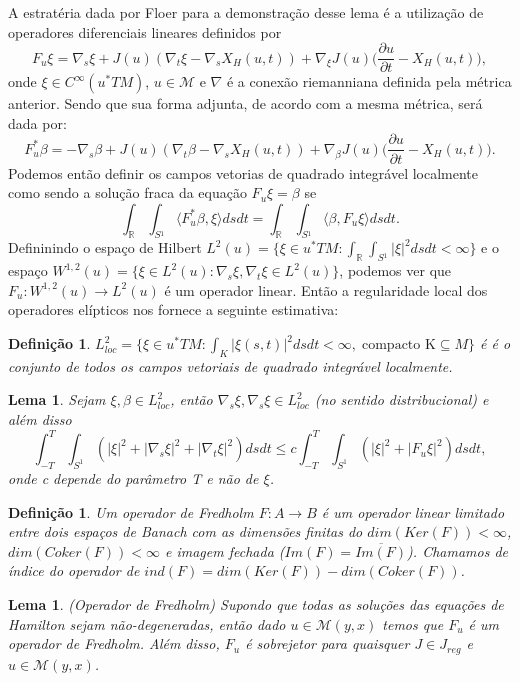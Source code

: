 \documentclass[12pt]{book}
\newtheorem{lema}[teorema]{Lema}
\newtheorem{definicao}[teorema]{Definição}
\newcommand{\derivadaparcial}[2]{\frac{\partial #1}{\partial #2}}
\newcommand{\iprod}[2]{\langle #1, #2 \rangle}
\newcommand{\real}[1]{\mathbb{R}^{#1}}
\newcommand{\vermelho}[1]{{\color{red}#1}}
\begin{document}
	A estratéria dada por Floer para a demonstração desse lema 
	é a utilização de operadores diferenciais lineares  definidos por 
	$$
	F_{u} \xi = \nabla_{s}\xi+J(u)(\nabla_{t}\xi - \nabla_{s}X_{H}(u,t))+\nabla_{\xi}J(u)\Big(\derivadaparcial{u}{t}-X_{H}(u,t)\Big),
	$$
	onde $\xi \in C^{\infty}(u^{*}TM)$, $u \in \mathcal{M}$ e $\nabla$ é a conexão riemanniana definida pela métrica anterior. Sendo que sua forma adjunta, de acordo com a mesma métrica, será dada por:
	$$
	F_{u}^{*} \beta = -\nabla_{s}\beta+J(u)(\nabla_{t}\beta - \nabla_{s}X_{H}(u,t))+\nabla_{\beta}J(u)\Big(\derivadaparcial{u}{t}-X_{H}(u,t)\Big).
	$$
	Podemos então definir 	os campos vetorias de quadrado integrável localmente como sendo a solução fraca da equação $F_{u}\xi = \beta$ se 
	$$
	\int_{\real{}} \int_{S{^{1}}} \iprod{F_{u}^{*}\beta}{\xi} dsdt= 
	\int_{\real{}} \int_{S{^{1}}} \iprod{\beta}{F_{u}\xi} dsdt.
	$$
	Defininindo o espaço de Hilbert $L^{2}(u) = \{\xi \in u^{*}TM: \int_{\real{}} \int_{S{^{1}}}|\xi|^{2} dsdt < \infty\}$ e o espaço $W^{1,2}(u) = \{\xi \in L^{2}(u):\nabla_{s} \xi,\nabla_{t} \xi \in L^{2}(u) \}$, podemos ver que $F_{u}: W^{1,2}(u) \to L^{2}(u)$ é um operador linear. \vermelho{Então a regularidade local dos operadores elípticos nos fornece a seguinte estimativa:}
	
	\begin{definicao}
		$L^{2}_{loc} = \{\xi \in u^{*}TM: \int_{K} |\xi(s,t)|^{2}dsdt <\infty, \; \text{compacto K} \subseteq M \}$ é é o conjunto de todos os campos vetoriais de quadrado integrável localmente.
	\end{definicao}
	
	\begin{lema}
		Sejam $\xi, \beta \in L^{2}_{loc}$, então $\nabla_{s}\xi, \nabla_{s}\xi \in L^{2}_{loc}$ (no sentido distribucional) e além disso
		$$
		\int_{-T}^{T}\int_{S^{1}}(|\xi|^{2}+|\nabla_{s}\xi|^{2}+|\nabla_{t}\xi|^{2})dsdt \leq c \int_{-T}^{T}\int_{S^{1}}(|\xi|^{2}+|F_{u}\xi|^{2})dsdt,
		$$
		onde c depende do parâmetro T e não de $\xi$.
	\end{lema}
	
	\begin{definicao}
		Um operador de Fredholm $F: A\to B$ é um operador linear limitado entre dois espaços de Banach com as dimensões finitas do $dim(Ker(F))< \infty$, $dim(Coker(F))< \infty$ e imagem fechada ($Im(F)=\overline{Im(F)}$). Chamamos de índice do operador de $ind (F)  = dim(Ker(F)) - dim(Coker(F))$.
	\end{definicao}
	
	\begin{lema}
		(Operador de Fredholm) Supondo que todas as soluções das equações de Hamilton sejam não-degeneradas, então dado $u \in \mathcal{M}(y,x)$ temos que $F_{u}$ é um operador de Fredholm. Além disso, $F_{u}$ é sobrejetor para quaisquer $J \in J_{reg}$ e $u \in \mathcal{M}(y,x)$.
	\end{lema}
	
\end{document}
